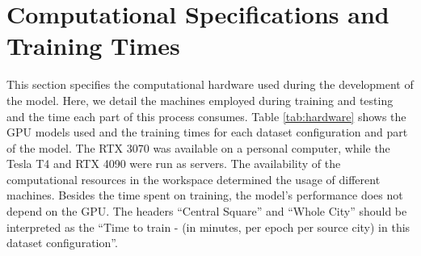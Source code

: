\section{Computational Specifications and Training Times} \label{sec:com_train}

This section specifies the computational hardware used during the development of the model. Here, we detail the machines employed during training and testing and the time each part of this process consumes. Table \ref{tab:hardware} shows the GPU models used and the training times for each dataset configuration and part of the model. The RTX 3070 was available on a personal computer, while the Tesla T4 and RTX 4090 were run as servers. The availability of the computational resources in the workspace determined the usage of different machines. Besides the time spent on training, the model's performance does not depend on the GPU. The headers ``Central Square'' and ``Whole City'' should be interpreted as the ``Time to train - (in minutes, per epoch per source city) in this dataset configuration''.



